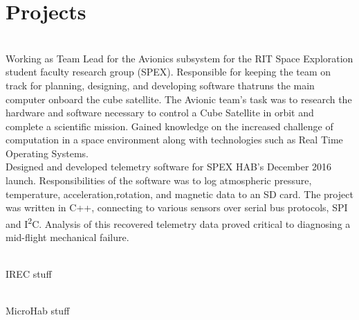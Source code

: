\documentclass[]{deedy-resume-openfont}
\begin{document}
\section{Projects}
\raggedright

\descript{}\hfill \location{}\\
Working as Team Lead for the Avionics subsystem for the RIT Space Exploration student faculty
research group (SPEX). Responsible for keeping the team on track for planning, designing, and developing
software thatruns the main computer onboard the cube satellite. The Avionic
team's task was to research the hardware and software necessary to control
a Cube Satellite in orbit and complete a scientific mission. Gained knowledge
on the increased challenge of computation in a space environment along with
technologies such as Real Time Operating Systems.
\bigbreak
{}
\descript{}\hfill \location{}\\
Designed and developed telemetry software for SPEX HAB’s December 2016 launch. Responsibilities of
the software was to log atmospheric pressure, temperature, acceleration,rotation, and magnetic data to an
SD card. The project was written in C++, connecting to various sensors over serial bus protocols, SPI and
I\textsuperscript{2}C. Analysis of this recovered telemetry data proved critical to diagnosing a mid-flight mechanical failure.
\sectionsep

\raggedright

\descript{}\hfill \location{}\\
IREC stuff

\bigbreak
{}
\descript{}\hfill \location{}\\
MicroHab stuff
\ 
\end{document}

